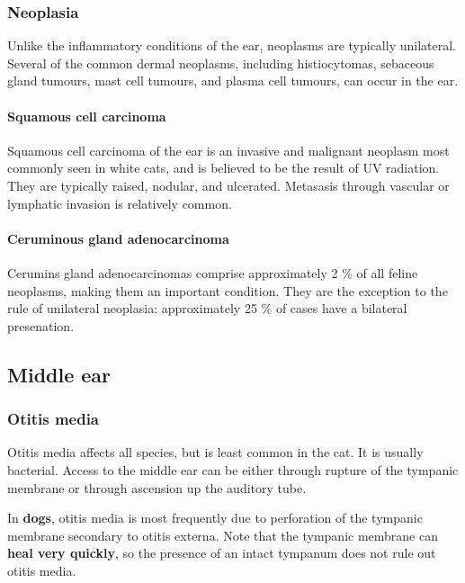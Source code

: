 \documentclass[openany]{article}
\let\oldparagraph\paragraph
\renewcommand{\paragraph}[1]{\oldparagraph{#1}\mbox{}}
\begin{document}
\subsubsection{Neoplasia}\label{neoplasia}

Unlike the inflammatory conditions of the ear, neoplasms are typically
unilateral. Several of the common dermal neoplasms, including
histiocytomas, sebaceous gland tumours, mast cell tumours, and plasma
cell tumours, can occur in the ear.

\paragraph{Squamous cell carcinoma}\label{squamous-cell-carcinoma}

Squamous cell carcinoma of the ear is an invasive and malignant neoplasm
most commonly seen in white cats, and is believed to be the result of UV
radiation. They are typically raised, nodular, and ulcerated. Metasasis
through vascular or lymphatic invasion is relatively common.

\paragraph{Ceruminous gland
adenocarcinoma}\label{ceruminous-gland-adenocarcinoma}

Cerumins gland adenocarcinomas comprise approximately 2 \% of all feline
neoplasms, making them an important condition. They are the exception to
the rule of unilateral neoplasia: approximately 25 \% of cases have a
bilateral presenation.

\subsection{Middle ear}\label{middle-ear}

\hypertarget{otitis-media}{\subsubsection{Otitis
media}\label{otitis-media}}

Otitis media affects all species, but is least common in the cat. It is
usually bacterial. Access to the middle ear can be either through
rupture of the tympanic membrane or through ascension up the auditory
tube.

In \textbf{dogs}, otitis media is most frequently due to perforation of
the tympanic membrane secondary to otitis externa. Note that the
tympanic membrane can \textbf{heal very quickly}, so the presence of an
intact tympanum does not rule out otitis media.
\end{document}
